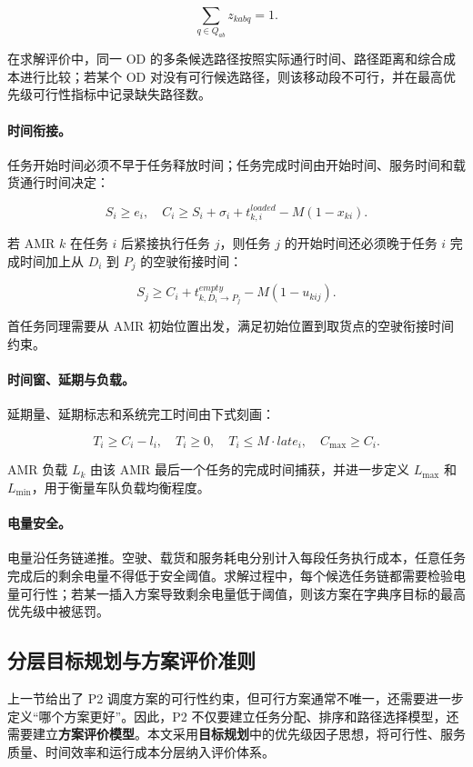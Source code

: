 \[
\sum_{q\in Q_{ab}}z_{kabq}=1.
\]

在求解评价中，同一 OD 的多条候选路径按照实际通行时间、路径距离和综合成本进行比较；若某个 OD 对没有可行候选路径，则该移动段不可行，并在最高优先级可行性指标中记录缺失路径数。

\paragraph{时间衔接。}
任务开始时间必须不早于任务释放时间；任务完成时间由开始时间、服务时间和载货通行时间决定：

\[
S_i\ge e_i,\quad
C_i\ge S_i+\sigma_i+t^{loaded}_{k,i}-M(1-x_{ki}).
\]

若 AMR $k$ 在任务 $i$ 后紧接执行任务 $j$，则任务 $j$ 的开始时间还必须晚于任务 $i$ 完成时间加上从 $D_i$ 到 $P_j$ 的空驶衔接时间：

\[
S_j\ge C_i+t^{empty}_{k,D_i\to P_j}-M(1-u_{kij}).
\]

首任务同理需要从 AMR 初始位置出发，满足初始位置到取货点的空驶衔接时间约束。

\paragraph{时间窗、延期与负载。}
延期量、延期标志和系统完工时间由下式刻画：

\[
T_i\ge C_i-l_i,\quad T_i\ge0,\quad T_i\le M\cdot late_i,\quad C_{\max}\ge C_i.
\]

AMR 负载 $L_k$ 由该 AMR 最后一个任务的完成时间捕获，并进一步定义 $L_{\max}$ 和 $L_{\min}$，用于衡量车队负载均衡程度。

\paragraph{电量安全。}
电量沿任务链递推。空驶、载货和服务耗电分别计入每段任务执行成本，任意任务完成后的剩余电量不得低于安全阈值。求解过程中，每个候选任务链都需要检验电量可行性；若某一插入方案导致剩余电量低于阈值，则该方案在字典序目标的最高优先级中被惩罚。

\subsection{分层目标规划与方案评价准则}

上一节给出了 P2 调度方案的可行性约束，但可行方案通常不唯一，还需要进一步定义“哪个方案更好”。因此，P2 不仅要建立任务分配、排序和路径选择模型，还需要建立\textbf{方案评价模型}。本文采用\textbf{目标规划}中的优先级因子思想，将可行性、服务质量、时间效率和运行成本分层纳入评价体系。

